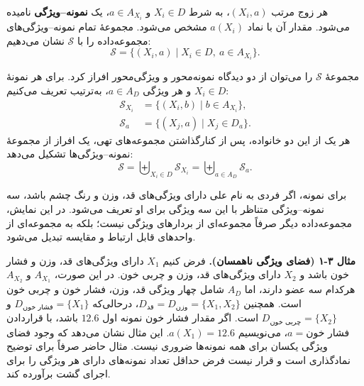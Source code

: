 \begin{definition}
هر زوج مرتب $(X_i,a)$، به شرط $X_i\in D$ و $a\in A_{X_i}$،
یک \textbf{نمونه--ویژگی} نامیده می‌شود. مقدار آن با نماد
$a(X_i)$ مشخص می‌شود. مجموعهٔ تمام نمونه--ویژگی‌های
مجموعه‌داده را با $\mathcal S$ نشان می‌دهیم:
\begin{equation}\label{cmp:eq:ch3-sample-feature-set}
\boxed{
\mathcal S=\bigl\{(X_i,a)\mid X_i\in D,\ a\in A_{X_i}\bigr\}.
}
\end{equation}
\end{definition}

\begin{definition}
مجموعهٔ $\mathcal S$ را می‌توان از دو دیدگاه نمونه‌محور و
ویژگی‌محور افراز کرد. برای هر نمونهٔ $X_i\in D$ و هر
ویژگی $a\in A_D$، به‌ترتیب تعریف می‌کنیم:
\begin{equation}\label{cmp:eq:ch3-sample-feature-partitions}
\boxed{
\begin{aligned}
\mathcal S_{X_i}
&=\bigl\{(X_i,b)\mid b\in A_{X_i}\bigr\},\\
\mathcal S_a
&=\bigl\{(X_j,a)\mid X_j\in D_a\bigr\}.
\end{aligned}
}
\end{equation}
هر یک از این دو خانواده، پس از کنارگذاشتن مجموعه‌های تهی،
یک افراز از مجموعهٔ نمونه--ویژگی‌ها تشکیل می‌دهد:
\begin{equation}\label{cmp:eq:ch3-sample-feature-disjoint-unions}
\boxed{
\mathcal S
=\biguplus_{X_i\in D}\mathcal S_{X_i}
=\biguplus_{a\in A_D}\mathcal S_a.
}
\end{equation}
\end{definition}
برای نمونه، اگر فردی به نام علی دارای ویژگی‌های قد، وزن و رنگ چشم باشد، سه نمونه--ویژگی متناظر با این سه ویژگی برای او تعریف می‌شود. در این نمایش، مجموعه‌داده دیگر صرفاً مجموعه‌ای از بردارهای ویژگی نیست؛ بلکه به مجموعه‌ای از واحدهای قابل ارتباط و مقایسه تبدیل می‌شود.

\noindent\textbf{مثال ۳-۱ (فضای ویژگی ناهمسان).}
فرض کنیم $X_1$ دارای ویژگی‌های قد، وزن و فشار خون باشد و $X_2$ دارای ویژگی‌های قد، وزن و چربی خون. در این صورت، $A_{X_1}$ و $A_{X_2}$ هرکدام سه عضو دارند، اما $A_D$ شامل چهار ویژگی قد، وزن، فشار خون و چربی خون است. همچنین $D_{\text{قد}}=D_{\text{وزن}}=\{X_1,X_2\}$، درحالی‌که $D_{\text{فشار خون}}=\{X_1\}$ و $D_{\text{چربی خون}}=\{X_2\}$ است. اگر مقدار فشار خون نمونه اول $12.6$ باشد، با قراردادن $a=\text{فشار خون}$، می‌نویسیم $a(X_1)=12.6$. این مثال نشان می‌دهد که وجود فضای ویژگی یکسان برای همه نمونه‌ها ضروری نیست. مثال حاضر صرفاً برای توضیح نمادگذاری است و قرار نیست فرض حداقل تعداد نمونه‌های دارای هر ویژگی را برای اجرای گشت برآورده کند.

